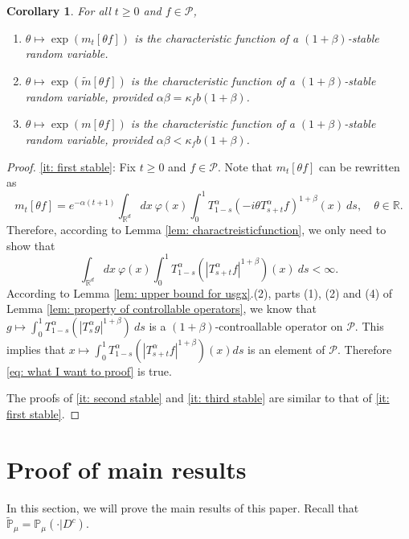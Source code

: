 \documentclass[12pt]{amsart}
\theoremstyle{plain}
\newtheorem{cor}[thm]{Corollary}
\theoremstyle{definition}
\numberwithin{equation}{section}
\begin{document}
\begin{cor}
\label{cor: alpha stable rv}
	For all $t\geq 0$ and $f\in \mathcal P$, 
\begin{enumerate}
\item 
\label{it: first stable}
    $\theta \mapsto \exp(m_t[\theta f])$ is the characteristic function of a $(1+\beta)$-stable random variable.
\item 
\label{it: second stable}
    $\theta \mapsto \exp(\tilde m[\theta f])$ is the characteristic function of a $(1+\beta)$-stable random variable, provided $\alpha\beta=\kappa_f b(1+\beta)$.
\item 
\label{it: third stable}
    $\theta \mapsto \exp(m[\theta f])$ is the characteristic function of a $(1+\beta)$-stable random variable, provided $\alpha\beta < \kappa_f b(1+\beta)$.
\end{enumerate}
\end{cor}
\begin{proof}
    \eqref{it: first stable}: 
	Fix $t\geq 0$ and $f\in \mathcal P$.
	Note that $m_t[\theta f]$ can be rewritten as 
\[
    m_t[\theta f]= e^{-\alpha (t+1)}\int_{\mathbb R^d} dx~\varphi(x)\int_0^1 T_{1-s}^\alpha (-i\theta T_{s+t}^\alpha f)^{1+\beta}(x)~ds,
    \quad \theta \in \mathbb R.
\]
	Therefore, according to Lemma \ref{lem: charactreisticfunction}, we only need to show that
\begin{equation}
\label{eq: what I want to proof}
	\int_{\mathbb R^d} dx~\varphi(x)\int_0^1 T_{1-s}^\alpha (|T_{s+t}^\alpha f|^{1+\beta})(x)~ds < \infty.
\end{equation}
	According to Lemma \ref{lem: upper bound for usgx}.(2), parts (1), (2) and (4) of Lemma \ref{lem: property of controllable operators},  we know that
$
	g \mapsto \int_0^1 T_{1-s}^\alpha (|T_{s}^\alpha g|^{1+\beta})~ds
$
	is a $(1+\beta)$-controallable operator on $\mathcal P$.
	This implies that $x \mapsto \int_0^1 T_{1-s}^\alpha (|T_{s+t}^\alpha f|^{1+\beta})(x) ds$ is an element of $\mathcal P$.
	Therefore \eqref{eq: what I want to proof} is true.

    The proofs of \eqref{it: second stable} and \eqref{it: third stable} are similar to that of \eqref{it: first stable}.
\end{proof}


\section{Proof of main results}

In this section, we will prove the main results of this paper. Recall that $\mathbb{\tilde{P}}_{\mu}=\mathbb{P}_{\mu}(\cdot|D^c)$.
\end{document}
